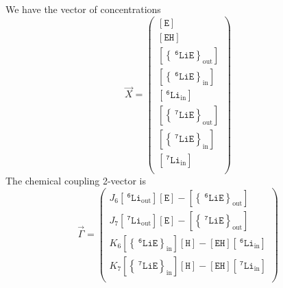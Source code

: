 \documentclass[aps,onecolumn,11pt]{revtex4}
\newcommand{\mychem}[1]{\mathtt{#1}}
\newcommand{\myconc}[1]{\left\lbrack{#1}\right\rbrack}
\newcommand{\spLi}[1]{{~^{\mychem{#1}}\mychem{Li}}}
\newcommand{\spEout}{\mychem{E}}
\newcommand{\Eout}{\myconc{\spEout}}
\newcommand{\spLiEin}[1]{\left\lbrace\spLi{#1}\spEout\right\rbrace_{\mathrm{in}}}
\newcommand{\LiEin}[1]{\myconc{\spLiEin{#1}}}
\newcommand{\spLiEout}[1]{\left\lbrace\spLi{#1}\spEout\right\rbrace_{\mathrm{out}}}
\newcommand{\LiEout}[1]{\myconc{\spLiEout{#1}}}
\newcommand{\spLiIn}[1]{{\spLi{#1}}_{\mathrm{in}}}
\newcommand{\LiIn}[1]{\myconc{\spLiIn{#1}}}
\newcommand{\spLiOut}[1]{{\spLi{#1}}_{\mathrm{out}}}
\newcommand{\LiOut}[1]{\myconc{\spLiOut{#1}}}
\newcommand{\spEHin}{\mychem{EH}}
\newcommand{\EHin}{\myconc{\spEHin}}
\newcommand{\spproton}{\mychem{H}}
\newcommand{\proton}{\myconc{\spproton}}
\begin{document}
We have the vector of concentrations
\begin{equation}
	\vec{X} = 
	\begin{pmatrix}
	\Eout\\
	\EHin\\
	\LiEout{6}\\
	\LiEin{6}\\
	\LiIn{6}\\
	\LiEout{7}\\
	\LiEin{7}\\
	\LiIn{7}\\
	\end{pmatrix}
\end{equation}
The chemical coupling 2-vector is
\begin{equation}
\vec{\Gamma} = 
\begin{pmatrix}
J_6 \LiOut{6} \Eout - \LiEout{6}\\
J_7 \LiOut{7} \Eout - \LiEout{7}\\
K_6 \LiEin{6}\proton - \EHin \LiIn{6}\\
K_7 \LiEin{7}\proton - \EHin \LiIn{7}\\
\end{pmatrix}
\end{equation}
\end{document}
